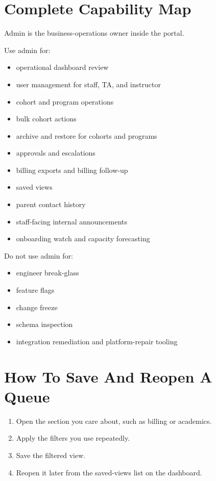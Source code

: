 \documentclass[11pt]{article}
\begin{document}
\section*{Complete Capability Map}
Admin is the business-operations owner inside the portal.

Use admin for:
\begin{itemize}
  \item operational dashboard review
  \item user management for staff, TA, and instructor
  \item cohort and program operations
  \item bulk cohort actions
  \item archive and restore for cohorts and programs
  \item approvals and escalations
  \item billing exports and billing follow-up
  \item saved views
  \item parent contact history
  \item staff-facing internal announcements
  \item onboarding watch and capacity forecasting
\end{itemize}

Do not use admin for:
\begin{itemize}
  \item engineer break-glass
  \item feature flags
  \item change freeze
  \item schema inspection
  \item integration remediation and platform-repair tooling
\end{itemize}

\section*{How To Save And Reopen A Queue}
\begin{enumerate}
  \item Open the section you care about, such as billing or academics.
  \item Apply the filters you use repeatedly.
  \item Save the filtered view.
  \item Reopen it later from the saved-views list on the dashboard.
\end{enumerate}
\end{document}
